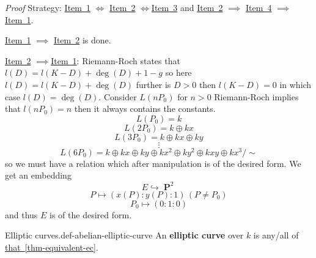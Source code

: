\documentclass[10pt,]{book}
\makeatletter
\newcommand{\terminology}[1]{\textbf{#1}}
\renewcommand*{\proofname}{Proof}
\renewenvironment{proof}[1][\proofname]{\par
  \pushQED{\qed}%
  \normalfont \topsep6\p@\@plus6\p@\relax
  \trivlist
  \item\relax
    {\itshape
    #1\@addpunct{.}}\hspace\labelsep\ignorespaces
}{%
  \popQED\endtrivlist\@endpefalse
}
\numberwithin{equation}{section}
\DeclareMathOperator{\PP}{\mathbf{P}}
\newcommand{\gt}{>}
\makeatother
\begin{document}
\begin{proof}\hypertarget{proof-1}{}
\hypertarget{p-14}{}%
Strategy: \hyperlink{item-cubic-eq}{Item~1} \(\iff\) \hyperlink{item-nonsing-pt}{Item~2} \(\iff\)\hyperlink{item-nonsing-gp}{Item~3} and \hyperlink{item-nonsing-pt}{Item~2} \(\implies\) \hyperlink{item-cmplx}{Item~4} \(\implies\) \hyperlink{item-cubic-eq}{Item~1}.%
\par
\hypertarget{p-15}{}%
\hyperlink{item-cubic-eq}{Item~1} \(\implies\) \hyperlink{item-nonsing-pt}{Item~2} is done.%
\par
\hypertarget{p-16}{}%
\hyperlink{item-nonsing-pt}{Item~2} \(\implies\)\hyperlink{item-cubic-eq}{Item~1}: Riemann-Roch states that \(l(D) = l(K-D) +  \deg(D) + 1 -g \) so here \(l(D) = l(K-D) + \deg (D)\) further is \(D\gt 0\) then \(l(K-D) = 0\) in which case \(l(D) = \deg(D)\). Consider \(L(nP_0)\) for \(n \gt 0\) Riemann-Roch implies that \(l(nP_0) = n\) then it always contains the constants.%
\begin{equation*}
L(P_0) = k
\end{equation*}
%
\begin{equation*}
L(2P_0) = k \oplus kx
\end{equation*}
%
\begin{equation*}
L(3P_0) = k \oplus kx \oplus ky
\end{equation*}
%
\begin{equation*}
\vdots
\end{equation*}
%
\begin{equation*}
L(6P_0) = k \oplus kx \oplus ky \oplus k x^2 \oplus ky^2 \oplus kxy \oplus kx^3/\sim
\end{equation*}
so we must have a relation which after manipulation is of the desired form. We get an embedding%
\begin{equation*}
E \hookrightarrow \PP^2
\end{equation*}
%
\begin{equation*}
P\mapsto (x(P):y(P): 1) \,(P\ne P_0)
\end{equation*}
%
\begin{equation*}
P_0 \mapsto (0:1 : 0)
\end{equation*}
and thus \(E\) is of the desired form.%
\end{proof}
\begin{definition}{Elliptic curves.}{def-abelian-elliptic-curve}%
\hypertarget{p-17}{}%
An \terminology{elliptic curve} over \(k\) is any/all of \hyperref[thm-equivalent-ec]{that~\ref{thm-equivalent-ec}}.%
\end{definition}
\end{document}
